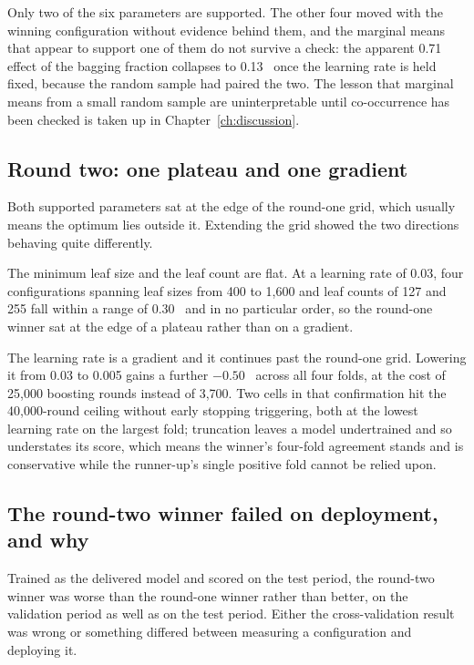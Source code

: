 Only two of the six parameters are supported. The other four moved with the winning
configuration without evidence behind them, and the marginal means that appear to support
one of them do not survive a check: the apparent 0.71~\pp{} effect of the bagging fraction
collapses to 0.13~\pp{} once the learning rate is held fixed, because the random sample had
paired the two. The lesson that marginal means from a small random sample are uninterpretable
until co-occurrence has been checked is taken up in Chapter~\ref{ch:discussion}.

\subsection{Round two: one plateau and one gradient}

Both supported parameters sat at the edge of the round-one grid, which usually means the
optimum lies outside it. Extending the grid showed the two directions behaving quite
differently.

The minimum leaf size and the leaf count are flat. At a learning rate of 0.03, four
configurations spanning leaf sizes from 400 to 1,600 and leaf counts of 127 and 255 fall
within a range of 0.30~\pp{} and in no particular order, so the round-one winner sat at the
edge of a plateau rather than on a gradient.

The learning rate is a gradient and it continues past the round-one grid. Lowering it from
0.03 to 0.005 gains a further $-0.50$~\pp{} across all four folds, at the cost of 25,000
boosting rounds instead of 3,700. Two cells in that confirmation hit the 40,000-round
ceiling without early stopping triggering, both at the lowest learning rate on the largest
fold; truncation leaves a model undertrained and so understates its score, which means the
winner's four-fold agreement stands and is conservative while the runner-up's single
positive fold cannot be relied upon.

\subsection{The round-two winner failed on deployment, and why}

Trained as the delivered model and scored on the test period, the round-two winner was
worse than the round-one winner rather than better, on the validation period as well as on
the test period. Either the cross-validation result was wrong or something differed between
measuring a configuration and deploying it.


